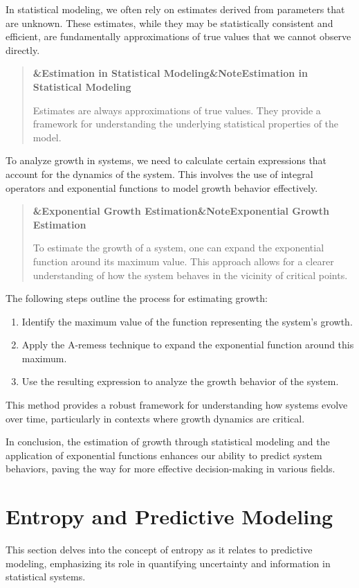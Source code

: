 \documentclass[a4paper]{article}
\newcommand{\boxheading}[1]{%
  \par\smallskip
  \noindent\textbf{\ifx&#1&Note\else#1\fi}\par
  \smallskip
}
\newenvironment{thmbox}[1][]{%
  \begin{quote}\color{blue!60!black}\boxheading{#1}\normalcolor
}{\end{quote}}
\newenvironment{rembox}[1][]{%
  \begin{quote}\color{black!70}\boxheading{#1}\normalcolor
}{\end{quote}}
\begin{document}
In statistical modeling, we often rely on estimates derived from parameters that are unknown. These estimates, while they may be statistically consistent and efficient, are fundamentally approximations of true values that we cannot observe directly.

\begin{rembox}[Estimation in Statistical Modeling]
Estimates are always approximations of true values. They provide a framework for understanding the underlying statistical properties of the model.
\end{rembox}

To analyze growth in systems, we need to calculate certain expressions that account for the dynamics of the system. This involves the use of integral operators and exponential functions to model growth behavior effectively.

\begin{thmbox}[Exponential Growth Estimation]
To estimate the growth of a system, one can expand the exponential function around its maximum value. This approach allows for a clearer understanding of how the system behaves in the vicinity of critical points.
\end{thmbox}

The following steps outline the process for estimating growth:

\begin{enumerate}
    \item Identify the maximum value of the function representing the system's growth.
    \item Apply the A-remess technique to expand the exponential function around this maximum.
    \item Use the resulting expression to analyze the growth behavior of the system.
\end{enumerate}

This method provides a robust framework for understanding how systems evolve over time, particularly in contexts where growth dynamics are critical.

In conclusion, the estimation of growth through statistical modeling and the application of exponential functions enhances our ability to predict system behaviors, paving the way for more effective decision-making in various fields.

\section{Entropy and Predictive Modeling}
This section delves into the concept of entropy as it relates to predictive modeling, emphasizing its role in quantifying uncertainty and information in statistical systems.
\end{document}
